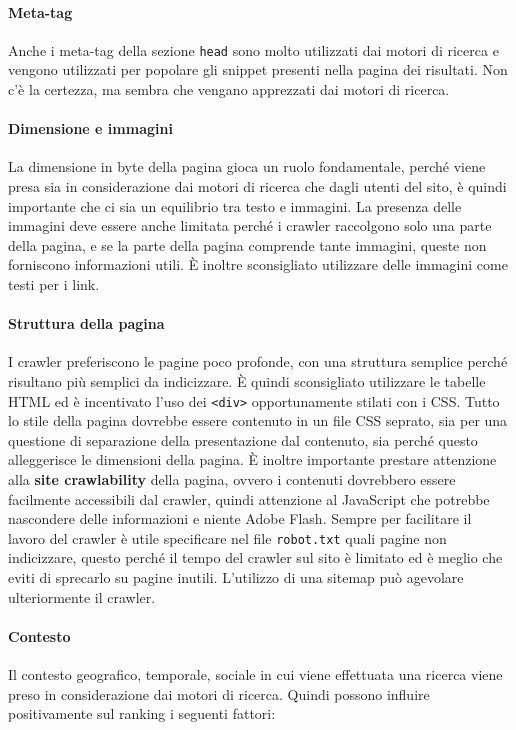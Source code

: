 \paragraph{Meta-tag}Anche i meta-tag della sezione \texttt{head} sono molto utilizzati dai motori di ricerca e vengono utilizzati per popolare gli snippet presenti nella pagina dei risultati.
Non c'è la certezza, ma sembra che vengano apprezzati dai motori di ricerca.

\paragraph{Dimensione e immagini} La dimensione in byte della pagina gioca un ruolo fondamentale, perché viene presa sia in considerazione dai motori di ricerca che dagli utenti del sito, è quindi importante che ci sia un equilibrio tra testo e immagini.
La presenza delle immagini deve essere anche limitata perché i crawler raccolgono solo una parte della pagina, e se la parte della pagina comprende tante immagini, queste non forniscono informazioni utili.
\`E inoltre sconsigliato utilizzare delle immagini come testi per i link.

\paragraph{Struttura della pagina} I crawler preferiscono le pagine poco profonde, con una struttura semplice perché risultano più semplici da indicizzare. \`E quindi sconsigliato utilizzare le tabelle HTML ed è incentivato l'uso dei \texttt{<div>} opportunamente stilati con i CSS.
Tutto lo stile della pagina dovrebbe essere contenuto in un file CSS seprato, sia per una questione di separazione della presentazione dal contenuto, sia perché questo alleggerisce le dimensioni della pagina.
\`E inoltre importante prestare attenzione alla \textbf{site crawlability} della pagina, ovvero i contenuti dovrebbero essere facilmente accessibili dal crawler, quindi attenzione al JavaScript che potrebbe nascondere delle informazioni e niente Adobe Flash.
Sempre per facilitare il lavoro del crawler è utile specificare nel file \texttt{robot.txt} quali pagine non indicizzare, questo perché il tempo del crawler sul sito è limitato ed è meglio che eviti di sprecarlo su pagine inutili. L'utilizzo di una sitemap può agevolare ulteriormente il crawler.

\paragraph{Contesto} Il contesto geografico, temporale, sociale in cui viene effettuata una ricerca viene preso in considerazione dai motori di ricerca. Quindi possono influire positivamente sul ranking i seguenti fattori:

